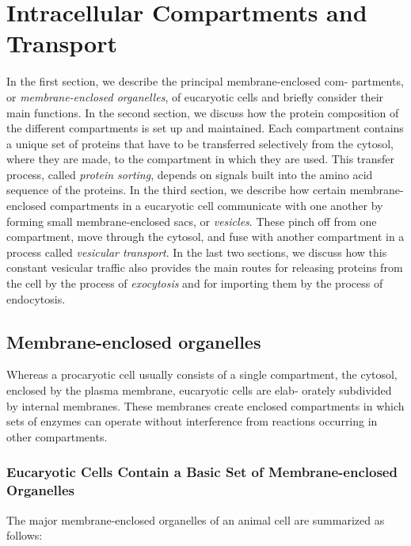 \chapter{Intracellular Compartments and Transport}

In the first section, we describe the principal membrane-enclosed com-
partments, or \textit{membrane-enclosed organelles}, of eucaryotic cells and
briefly consider their main functions. In the second section, we discuss
how the protein composition of the different compartments is set up and
maintained. Each compartment contains a unique set of proteins that
have to be transferred selectively from the cytosol, where they are made,
to the compartment in which they are used. This transfer process, called
\textit{protein sorting}, depends on signals built into the amino acid sequence of
the proteins. In the third section, we describe how certain membrane-enclosed 
compartments in a eucaryotic cell communicate with one
another by forming small membrane-enclosed sacs, or \textit{vesicles}. These
pinch off from one compartment, move through the cytosol, and fuse
with another compartment in a process called \textit{vesicular transport}. In the
last two sections, we discuss how this constant vesicular traffic also provides 
the main routes for releasing proteins from the cell by the process
of \textit{exocytosis} and for importing them by the process of endocytosis.

\section{Membrane-enclosed organelles}

Whereas a procaryotic cell usually consists of a single compartment, the
cytosol, enclosed by the plasma membrane, eucaryotic cells are elab-
orately subdivided by internal membranes. These membranes create
enclosed compartments in which sets of enzymes can operate without
interference from reactions occurring in other compartments.

\subsection{Eucaryotic Cells Contain a Basic Set of Membrane-enclosed Organelles}

The major membrane-enclosed organelles of an animal cell are summarized as follows:

